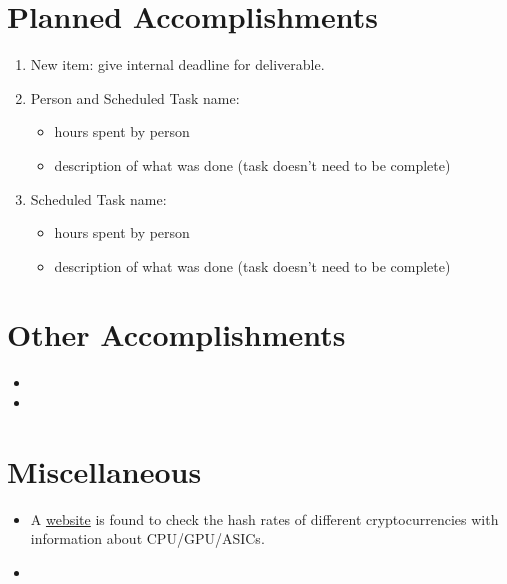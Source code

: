 \documentclass[11pt]{article}
\begin{document}
\section{Planned Accomplishments}
\begin{enumerate}
\item New item: give internal deadline for deliverable.
\item Person and Scheduled Task name:
   \begin{itemize}
      \item hours spent by person
      \item description of what was done (task doesn't need to be complete)
   \end{itemize}
\item Scheduled Task name:
   \begin{itemize}
      \item hours spent by person
      \item description of what was done (task doesn't need to be complete)
   \end{itemize}
\end{enumerate}

%
%
\section{Other Accomplishments}
\begin{itemize}
\item
\item
\end{itemize}

\section{Miscellaneous}

\begin{itemize}
\item A \href{https://whattomine.com}{website} is found to check the hash rates of different cryptocurrencies with information about CPU/GPU/ASICs.
\item 

\end{itemize}

%
%
\end{document}
